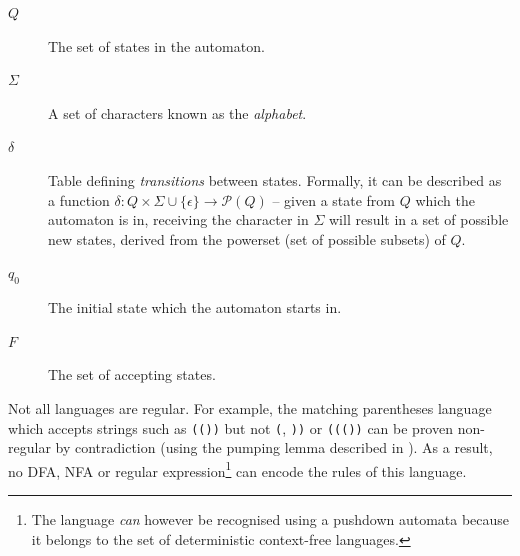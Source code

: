 \documentclass[a4paper,openany]{book}
\begin{document}
\begin{description}
\item[$Q$] The set of states in the automaton.
\item[$\Sigma$] A set of characters known as the \emph{alphabet}.
\item[$\delta$] Table defining \emph{transitions} between states. Formally, it can be described as a function $\delta : Q \times \Sigma \cup \{\epsilon\} \rightarrow \mathcal{P}(Q)$ -- given a state from $Q$ which the automaton is in, receiving the character in $\Sigma$ will result in a set of possible new states, derived from the powerset (set of possible subsets) of $Q$.
\item[$q_0$] The initial state which the automaton starts in.
\item[$F$] The set of accepting states.
\end{description}

Not all languages are regular. For example, the matching parentheses language which accepts strings such as \texttt{(())} but not \texttt{(}, \texttt{))} or \texttt{((())} can be proven non-regular by contradiction (using the pumping lemma described in \citet{rabin1959finite}). As a result, no DFA, NFA or regular expression\footnote{The language \emph{can} however be recognised using a pushdown automata because it belongs to the set of deterministic context-free languages.} can encode the rules of this language.
\end{document}
